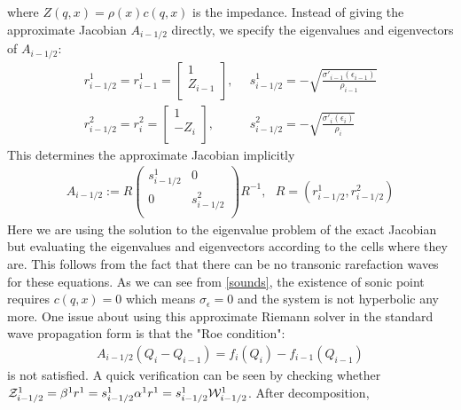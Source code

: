 \documentclass{article}
\begin{document}
where $Z(q,x)=\rho(x)c(q,x)$ is the impedance.
Instead of giving the approximate Jacobian $A_{i-1/2}$ directly, we specify the eigenvalues and eigenvectors of $A_{i-1/2}$:
\begin{align}
r^1_{i-1/2}=r^1_{i-1}=\left[
                        \begin{array}{c}
                          1 \\ Z_{i-1} \\
                        \end{array}
                      \right], & \,\,\, s^1_{i-1/2}=-\sqrt{\frac{\sigma'_{i-1}(\epsilon_{i-1})}{\rho_{i-1}}}\\
r^2_{i-1/2}=r^2_{i}=\left[
                        \begin{array}{c}
                          1 \\ -Z_{i} \\
                        \end{array}
                      \right], &\,\,\, s^2_{i-1/2}=-\sqrt{\frac{\sigma'_{i}(\epsilon_{i})}{\rho_{i}}}
\end{align}
This determines the approximate Jacobian implicitly
\begin{align}
A_{i-1/2}:=R \left(
               \begin{array}{cc}
                 s^1_{i-1/2} & 0 \\
                 0 &  s^2_{i-1/2} \\
               \end{array}
             \right) R^{-1}, \,\,\,\, R=(r^1_{i-1/2}, r^2_{i-1/2})
\end{align}
Here we are using the solution to the eigenvalue problem of the exact Jacobian but evaluating the eigenvalues and eigenvectors according to the cells where they are. This follows from the fact that there can be no transonic rarefaction waves for these equations. As we can see from \eqref{sounds}, the existence of sonic point requires $c(q,x)=0$ which means $\sigma_{\epsilon}=0$ and the system is not hyperbolic any more. %
One issue about using this approximate Riemann solver in the standard wave propagation form is that the "Roe condition":
\begin{align}
A_{i-1/2}(Q_i-Q_{i-1})=f_{i}(Q_i)-f_{i-1}(Q_{i-1})
\end{align}
is not satisfied.
A quick verification can be seen by checking whether ${\cal Z}^1_{i-1/2}=\beta^1 r^1=s^1_{i-1/2} \alpha^1r^1=s^1_{i-1/2}{\cal W}^1_{i-1/2}$. After decomposition,
\end{document}
